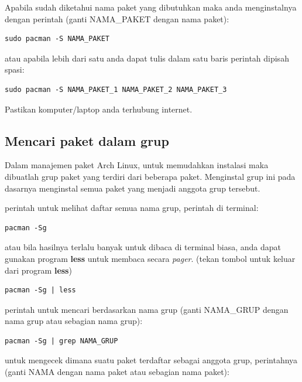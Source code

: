 \documentclass[12pt,]{article}
\begin{document}
	Apabila sudah diketahui nama paket yang dibutuhkan maka anda menginstalnya dengan perintah
	(ganti NAMA\_PAKET dengan nama paket):
	
	\begin{verbatim}
sudo pacman -S NAMA_PAKET
	\end{verbatim}
	
	atau apabila lebih dari satu anda dapat tulis dalam satu baris perintah dipisah spasi:
	
	\begin{verbatim}
sudo pacman -S NAMA_PAKET_1 NAMA_PAKET_2 NAMA_PAKET_3
	\end{verbatim}
	
	Pastikan komputer/laptop anda terhubung internet.
	
	\subsection{Mencari paket dalam grup}
	
	Dalam manajemen paket Arch Linux, untuk memudahkan instalasi maka dibuatlah grup paket yang terdiri dari beberapa paket.
	Menginstal grup ini pada dasarnya menginstal semua paket yang menjadi anggota grup tersebut.
	
	perintah untuk melihat daftar semua nama grup, perintah di terminal:
	
	\begin{verbatim}
pacman -Sg
	\end{verbatim}
	
	atau bila hasilnya terlalu banyak untuk dibaca di terminal biasa, anda dapat gunakan program \textbf{less} untuk membaca secara \textit{pager}.
	(tekan tombol  untuk keluar dari program \textbf{less})
	
	\begin{verbatim}
pacman -Sg | less
	\end{verbatim}
	
	perintah untuk mencari berdasarkan nama grup (ganti NAMA\_GRUP dengan nama grup atau sebagian nama grup):
	
	\begin{verbatim}
pacman -Sg | grep NAMA_GRUP
	\end{verbatim}
	
	untuk mengecek dimana suatu paket terdaftar sebagai anggota grup, perintahnya
	(ganti NAMA dengan nama paket atau sebagian nama paket):
	
\end{document}
